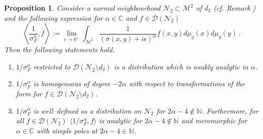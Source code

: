 \documentclass[10pt]{book}
\newcommand{\Dcal}{\mathcal{D}}
\newcommand{\Mcal}{\mathcal{M}}
\newcommand{\Ncal}{\mathcal{N}}
\theoremstyle{break}
\newtheorem{proposition}{Proposition}
\begin{document}
\begin{proposition}
Consider a normal neighbourhood $\Ncal_2\subset\Mcal^2$ of $d_2$ (cf. Remark %
)
and the following expression for $\alpha\in \mathbb{C}$ and $f\in \Dcal(\Ncal_2)$ 
\[
\left\langle \frac{1}{\sigma^\alpha_F}, f \right\rangle := \lim_{\epsilon\to0^+ } \int_{\Mcal^2} \frac{1}{(\sigma(x,y)+i\epsilon)^{\alpha}} f(x,y)  d\mu_g (x) d\mu_g (y)\,.
\]
Then the following statements hold.
\begin{enumerate}
\item $1/{\sigma^\alpha_F}$ restricted to $\Dcal(\Ncal_2\setminus d_2)$ is a distribution which is weakly analytic in $\alpha$.
\item $1/{\sigma^\alpha_F}$ is homogeneous of degree $-2\alpha$ with respect to transformations of the form %
for $f\in \Dcal(\Ncal_2\setminus d_2)$.
\item $1/{\sigma^\alpha_F}$ is well--defined as a distribution on $\Ncal_2$ for $2\alpha-4\notin \mathbb{N}$. 
Furthermore, for all $f\in\Dcal(\Ncal_2)$ $\langle 1/{\sigma^\alpha_F},f\rangle$  is analytic for $2\alpha-4\notin \mathbb{N}$ and meromorphic for $\alpha \in \mathbb{C}$ with simple poles at $2\alpha-4\in \mathbb{N}$. 
\end{enumerate}
\end{proposition}
\end{document}
